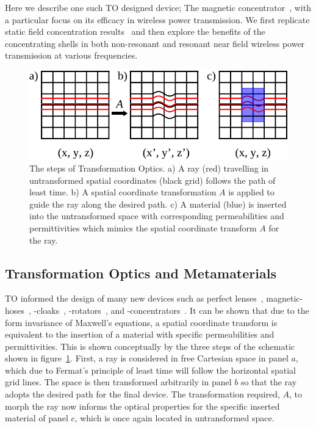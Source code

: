 \documentclass[11pt]{iopart}
\begin{document}
Here we describe one such TO designed device; The magnetic
concentrator~\cite{Navau2012, Rahm2008, Wang2008}, with a particular focus on its efficacy
in wireless power transmission. We first replicate static field
concentration results~\cite{N2014} and then explore the benefits of
the concentrating shells in both non-resonant and resonant near field
wireless power transmission at various frequencies.

\begin{figure}
  \begin{center}
   \noindent\includegraphics[width=0.65\linewidth]{images/trans_Opt_edit.pdf}
  \end{center}
  \caption{The steps of Transformation Optics. a) A ray (red)
    travelling in untransformed spatial coordinates (black grid)
    follows the path of least time. b) A spatial coordinate
    transformation $A$ is applied to guide the ray along the desired
    path. c) A material (blue) is inserted into the untransformed
    space with corresponding permeabilities and permittivities which mimics
    the spatial coordinate transform $A$ for the ray. }
  \label{fig:TO}
  \vspace{-0.7em}
\end{figure}

\subsection{Transformation Optics and Metamaterials}
TO informed the design of many new devices such as perfect
lenses~\cite{Pendry2000}, magnetic-hoses~\cite{Navau2014}, -cloaks~\cite{Sun2017},
-rotators~\cite{Sun2017}, and -concentrators~\cite{Navau2012, Rahm2008, Wang2008}. It
can be shown that due to the form invariance of Maxwell's equations, a
spatial coordinate transform is equivalent to the insertion of a
material with specific permeabilities and permittivities. This is shown
conceptually by the three steps of the schematic shown in
figure~\ref{fig:TO}. First, a ray is considered in free Cartesian space
in panel $a$, which due to Fermat's principle of least time will 
follow the horizontal spatial grid lines.  The space is then
transformed arbitrarily in panel $b$ so that the ray adopts the
desired path for the final device. The transformation required, $A$,
to morph the ray now informs the optical properties for the specific
inserted material of panel $c$, which is once again located in
untransformed space.
\end{document}
